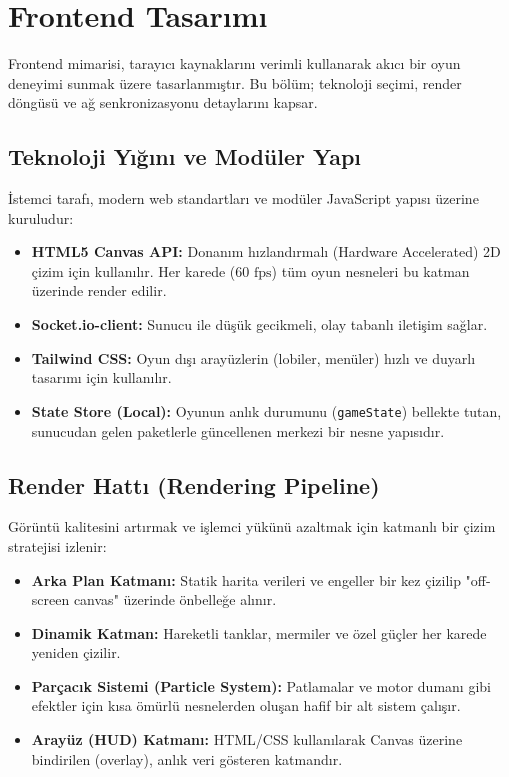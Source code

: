 \documentclass[12pt,a4paper]{article}
\begin{document}
\section{Frontend Tasarımı}
Frontend mimarisi, tarayıcı kaynaklarını verimli kullanarak akıcı bir oyun deneyimi sunmak üzere tasarlanmıştır. Bu bölüm; teknoloji seçimi, render döngüsü ve ağ senkronizasyonu detaylarını kapsar.

\subsection{Teknoloji Yığını ve Modüler Yapı}
İstemci tarafı, modern web standartları ve modüler JavaScript yapısı üzerine kuruludur:
\begin{itemize}
      \item \textbf{HTML5 Canvas API:} Donanım hızlandırmalı (Hardware Accelerated) 2D çizim için kullanılır. Her karede ($60 \text{ fps}$) tüm oyun nesneleri bu katman üzerinde render edilir.
      \item \textbf{Socket.io-client:} Sunucu ile düşük gecikmeli, olay tabanlı iletişim sağlar.
      \item \textbf{Tailwind CSS:} Oyun dışı arayüzlerin (lobiler, menüler) hızlı ve duyarlı tasarımı için kullanılır.
      \item \textbf{State Store (Local):} Oyunun anlık durumunu (\texttt{gameState}) bellekte tutan, sunucudan gelen paketlerle güncellenen merkezi bir nesne yapısıdır.
\end{itemize}

\subsection{Render Hattı (Rendering Pipeline)}
Görüntü kalitesini artırmak ve işlemci yükünü azaltmak için katmanlı bir çizim stratejisi izlenir:
\begin{itemize}
      \item \textbf{Arka Plan Katmanı:} Statik harita verileri ve engeller bir kez çizilip "off-screen canvas" üzerinde önbelleğe alınır.
      \item \textbf{Dinamik Katman:} Hareketli tanklar, mermiler ve özel güçler her karede yeniden çizilir.
      \item \textbf{Parçacık Sistemi (Particle System):} Patlamalar ve motor dumanı gibi efektler için kısa ömürlü nesnelerden oluşan hafif bir alt sistem çalışır.
      \item \textbf{Arayüz (HUD) Katmanı:} HTML/CSS kullanılarak Canvas üzerine bindirilen (overlay), anlık veri gösteren katmandır.
\end{itemize}
\end{document}
